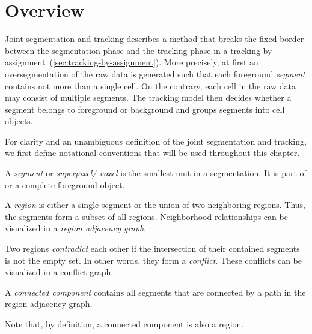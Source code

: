 \section{Overview}
\label{sec:joint-overview}

Joint segmentation and tracking describes a method that breaks the fixed border between the
segmentation phase and the tracking phase in a
tracking-by-assignment~(\cref{sec:tracking-by-assignment}). More precisely, at first an
oversegmentation of the raw data is generated such that each foreground \emph{segment} contains not
more than a single cell. On the contrary, each cell in the raw data may consist of multiple
segments. The tracking model then decides whether a segment belongs to foreground or background and
groups segments into cell objects.

For clarity and an unambiguous definition of the joint segmentation and tracking, we first define
notational conventions that will be used throughout this chapter.
\begin{mydef}
    \label{def:joint-segment}
    A \emph{segment} or \emph{superpixel/-voxel} is the smallest unit in a segmentation. It is part of or a complete foreground
    object.
\end{mydef}

\begin{mydef}
    \label{def:joint-region}
    A \emph{region} is either a single segment or the union of two neighboring regions. Thus, the
    segments form a subset of all regions. Neighborhood relationships can be visualized in a
    \emph{region adjacency graph}.
\end{mydef}

\begin{mydef}
    \label{def:joint-conflict}
    Two regions \emph{contradict} each other if the intersection of their contained segments is not
    the empty set. In other words, they form a \emph{conflict}. These conflicts can be visualized in
    a conflict graph.
\end{mydef}

\begin{mydef}
    \label{def:joint-connected-component}
    A \emph{connected component} contains all segments that are connected by a path in the region
    adjacency graph.
\end{mydef}
Note that, by definition, a connected component is also a region. 

